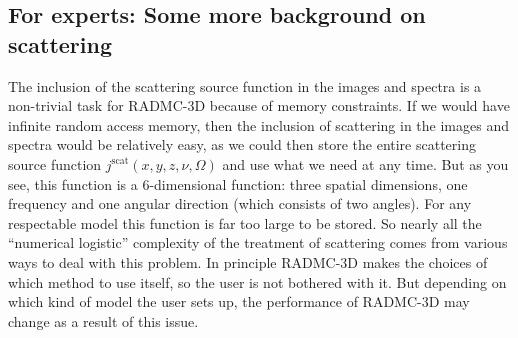 \documentclass{report}
\begin{document}
\subsection{For experts: Some more background on scattering}
\label{sec-scat-background}
%
The inclusion of the scattering source function in the images and spectra is
a non-trivial task for RADMC-3D because of memory constraints. If we would
have infinite random access memory, then the inclusion of scattering in the
images and spectra would be relatively easy, as we could then store the
entire scattering source function $j^{\mathrm{scat}}(x,y,z,\nu,\Omega)$ and
use what we need at any time. But as you see, this function is a
6-dimensional function: three spatial dimensions, one frequency and one
angular direction (which consists of two angles). For any respectable model
this function is far too large to be stored. So nearly all the ``numerical
logistic'' complexity of the treatment of scattering comes from various ways
to deal with this problem. In principle RADMC-3D makes the choices of which
method to use itself, so the user is not bothered with it. But depending on
which kind of model the user sets up, the performance of RADMC-3D may change
as a result of this issue.
\end{document}
